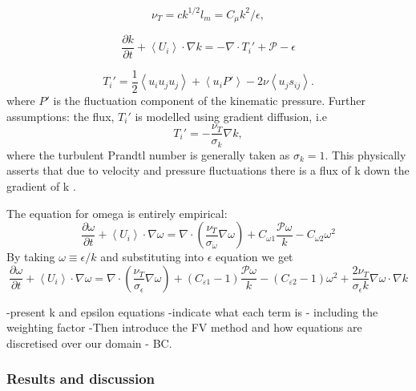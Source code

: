 \documentclass[12pt,oneside,a4paper]{article}
\newcommand{\pdev}[2]{\frac{\partial {#1}}{\partial {#2}}}
\begin{document}
\begin{equation}
\nu_T = c k^{1/2} l_m = C_\mu k^2/\epsilon,
\end{equation}


\begin{equation}
\pdev{k}{t} + \left< U_i \right> \cdot \nabla k = -\nabla \cdot T_i' + \mathcal{P} - \epsilon 
\end{equation}

\begin{equation}
T_i' = \frac{1}{2} \left< u_i u_j u_j \right> + \left< u_i P' \right> - 2 \nu \left< u_j s_{ij} \right>.
\end{equation}
where $P'$ is the fluctuation component of the kinematic pressure. Further assumptions: the flux, $T_i'$ is modelled using gradient diffusion, i.e 
\begin{equation}
T_i' = -\frac{\nu_T}{\sigma_{k}} \nabla k,
\end{equation}
where the turbulent Prandtl number is generally taken as $\sigma_k=1$. This physically asserts that due to velocity and pressure fluctuations there is a flux of k down the gradient of k \citep{pope2001}.

The equation for omega is entirely empirical:
\begin{equation}
\pdev{\omega}{t}  + \left< U_i \right> \cdot \nabla \omega = \nabla \cdot \left( \frac{\nu_T}{\sigma_{\omega}} \nabla \omega \right) + C_{\omega 1} \frac{\mathcal{P} \omega}{k} - C_{\omega 2} \omega^2
\end{equation}
By taking $\omega \equiv \epsilon /k$ and substituting into $\epsilon$ equation we get
\begin{equation}
\pdev{\omega}{t}  + \left< U_i \right> \cdot \nabla \omega = \nabla \cdot \left( \frac{\nu_T}{\sigma_{\epsilon}} \nabla \omega \right) + (C_{\varepsilon 1}-1) \frac{\mathcal{P} \omega}{k} - (C_{\varepsilon 2}-1) \omega^2 + \frac{2 \nu_T}{\sigma_\epsilon k}\nabla \omega \cdot \nabla k
\end{equation}


-present k and epsilon equations
-indicate what each term is - including the weighting factor
-Then introduce the FV method and how equations are discretised over our domain - BC. 




\subsubsection{Results and discussion}
\end{document}
